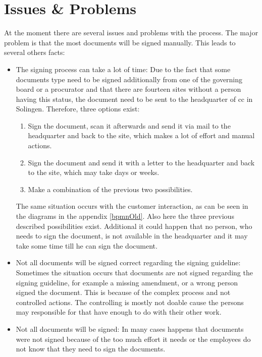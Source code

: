 \section{Issues \& Problems} \label{sec:issues}
At the moment there are several issues and problems with the process. The major problem is that the most documents will be signed manually. This leads to several others facts:
\begin{itemize}
	\item The signing process can take a lot of time: \newline
	Due to the fact that some documents type need to be signed additionally from one of the governing board or a procurator and that there are fourteen sites without a person having this status, the document need to be sent to the headquarter of \gls{cc} in Solingen. Therefore, three options exist:
	\begin{enumerate}
		\item Sign the document, scan it afterwards and send it via mail to the headquarter and back to the site, which makes a lot of effort and manual actions.
		\item Sign the document and send it with a letter to the headquarter and back to the site, which may take days or weeks.
		\item Make a combination of the previous two possibilities.
	\end{enumerate}
	The same situation occurs with the customer interaction, as can be seen in the diagrams in the appendix \ref{bpmnOld}. Also here the three previous described possibilities exist. \newline
	Additional it could happen that no person, who needs to sign the document, is not available in the headquarter and it may take some time till he can sign the document.
	\item Not all documents will be signed correct regarding the signing guideline: \newline
	Sometimes the situation occurs that documents are not signed regarding the signing guideline, for example a missing amendment, or a wrong person signed the document. This is because of the complex process and not controlled actions. The controlling is mostly not doable cause the persons may responsible for that have enough to do with their other work.
	\item Not all documents will be signed:\newline
	In many cases happens that documents were not signed because of the too much effort it needs or the employees do not know that they need to sign the documents. 
\end{itemize} 
